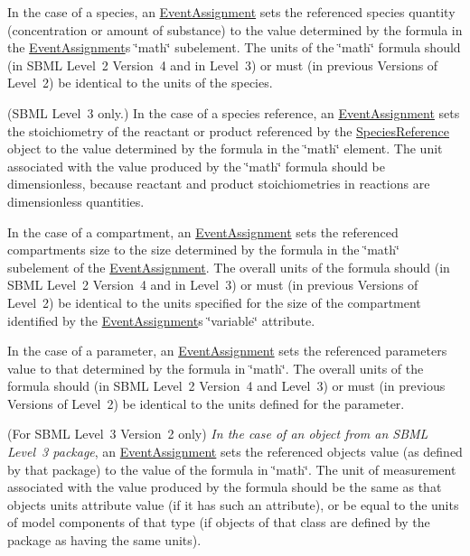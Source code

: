 \begin{DoxyItemize}
\item In the case of a species, an \hyperlink{class_event_assignment}{Event\+Assignment} sets the referenced species\textquotesingle{} quantity (concentration or amount of substance) to the value determined by the formula in the \hyperlink{class_event_assignment}{Event\+Assignment}\textquotesingle{}s \char`\"{}math\char`\"{} subelement. The units of the \char`\"{}math\char`\"{} formula should (in S\+B\+ML Level~2 Version~4 and in Level~3) or must (in previous Versions of Level~2) be identical to the units of the species.


\item (S\+B\+ML Level~3 only.) In the case of a species reference, an \hyperlink{class_event_assignment}{Event\+Assignment} sets the stoichiometry of the reactant or product referenced by the \hyperlink{class_species_reference}{Species\+Reference} object to the value determined by the formula in the \char`\"{}math\char`\"{} element. The unit associated with the value produced by the \char`\"{}math\char`\"{} formula should be {\ttfamily dimensionless}, because reactant and product stoichiometries in reactions are dimensionless quantities.


\item In the case of a compartment, an \hyperlink{class_event_assignment}{Event\+Assignment} sets the referenced compartment\textquotesingle{}s size to the size determined by the formula in the \char`\"{}math\char`\"{} subelement of the \hyperlink{class_event_assignment}{Event\+Assignment}. The overall units of the formula should (in S\+B\+ML Level~2 Version~4 and in Level~3) or must (in previous Versions of Level~2) be identical to the units specified for the size of the compartment identified by the \hyperlink{class_event_assignment}{Event\+Assignment}\textquotesingle{}s \char`\"{}variable\char`\"{} attribute.


\item In the case of a parameter, an \hyperlink{class_event_assignment}{Event\+Assignment} sets the referenced parameter\textquotesingle{}s value to that determined by the formula in \char`\"{}math\char`\"{}. The overall units of the formula should (in S\+B\+ML Level~2 Version~4 and Level~3) or must (in previous Versions of Level~2) be identical to the units defined for the parameter.


\item (For S\+B\+ML Level~3 Version~2 only) {\itshape In the case of an object from an S\+B\+ML Level~3 package}, an \hyperlink{class_event_assignment}{Event\+Assignment} sets the referenced object\textquotesingle{}s value (as defined by that package) to the value of the formula in \char`\"{}math\char`\"{}. The unit of measurement associated with the value produced by the formula should be the same as that object\textquotesingle{}s units attribute value (if it has such an attribute), or be equal to the units of model components of that type (if objects of that class are defined by the package as having the same units). 
\end{DoxyItemize}

